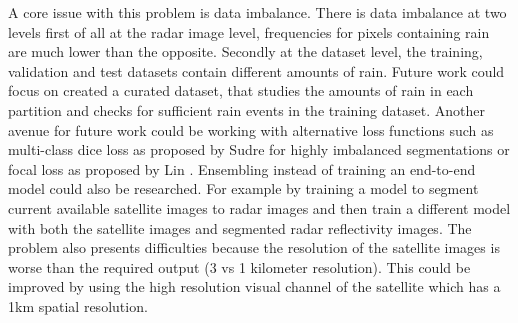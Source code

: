 A core issue with this problem is data imbalance. There is data imbalance at two levels
first of all at the radar image level, frequencies for pixels containing rain are much lower than the opposite.
Secondly at the dataset level, the training, validation and test datasets contain different amounts of rain. Future work
could focus on created a curated dataset, that studies the amounts of rain in each partition and checks for sufficient rain events
in the training dataset.
Another avenue for future work could be working with alternative loss functions such as multi-class dice loss as proposed by Sudre \cite{DBLP:journals/corr/SudreLVOC17} for 
highly imbalanced segmentations or focal loss as proposed by Lin \cite{DBLP:journals/corr/abs-1708-02002}.
Ensembling instead of training an end-to-end model could also be researched. For example by training a model to segment current available satellite images
to radar images and then train a different model with both the satellite images and segmented radar reflectivity images.
The problem also presents difficulties because the resolution of the satellite images is worse than the required output (3 vs 1 kilometer resolution).
This could be improved by using the high resolution visual channel of the satellite which has a 1km spatial resolution.